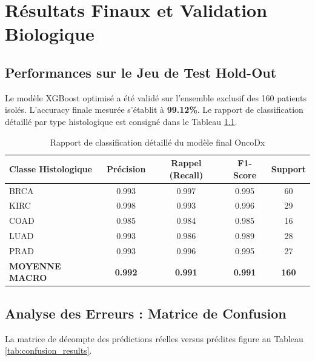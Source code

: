 \documentclass[12pt,a4paper]{report}
\let\oldchapter\chapter
\renewcommand{\chapter}{\clearpage\oldchapter}
\begin{document}
\chapter{R\'esultats Finaux et Validation Biologique}
\section{Performances sur le Jeu de Test Hold-Out}
Le mod\`ele XGBoost optimis\'e a \'et\'e valid\'e sur l'ensemble exclusif des 160 patients isol\'es. L'accuracy finale mesur\'ee s'\'etablit \`a \textbf{99.12\%}. Le rapport de classification d\'etaill\'e par type histologique est consign\'e dans le Tableau \ref{tab:class_report}.

\begin{table}[H]
\centering
\caption{Rapport de classification d\'etaill\'e du mod\`ele final OncoDx}
\label{tab:class_report}
\begin{tabular}{lcccc}
\toprule
\textbf{Classe Histologique} & \textbf{Pr\'ecision} & \textbf{Rappel (Recall)} & \textbf{F1-Score} & \textbf{Support} \\
\midrule
BRCA & 0.993 & 0.997 & 0.995 & 60 \\
KIRC & 0.998 & 0.993 & 0.996 & 29 \\
COAD & 0.985 & 0.984 & 0.985 & 16 \\
LUAD & 0.993 & 0.986 & 0.989 & 28 \\
PRAD & 0.993 & 0.996 & 0.995 & 27 \\
\midrule
\rowcolor{infobg}\textbf{MOYENNE MACRO} & \textbf{0.992} & \textbf{0.991} & \textbf{0.991} & \textbf{160} \\
\bottomrule
\end{tabular}
\end{table}

\section{Analyse des Erreurs : Matrice de Confusion}
La matrice de d\'ecompte des pr\'edictions réelles versus pr\'edites figure au Tableau \ref{tab:confusion_results}.
\end{document}
